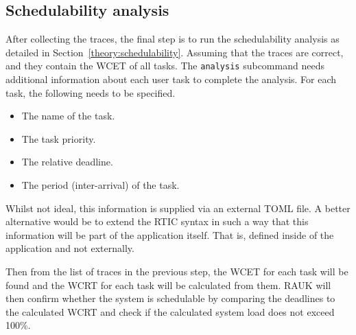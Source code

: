 \subsection{Schedulability analysis}
After collecting the traces, the final step is to run the schedulability analysis as
detailed in Section~\ref{theory:schedulability}. Assuming that the traces are correct,
and they contain the WCET of all tasks. The \texttt{analysis} subcommand needs
additional information about each user task to complete the analysis. For each
task, the following needs to be specified.
\begin{itemize}
    \item The name of the task.
    \item The task priority.
    \item The relative deadline.
    \item The period (inter-arrival) of the task.
\end{itemize}
Whilst not ideal, this information is supplied via an external TOML file. A
better alternative would be to extend the RTIC syntax in such a way that this
information will be part of the application itself. That is, defined inside of
the application and not externally.

Then from the list of traces in the previous step, the WCET for each task will
be found and the WCRT for each task will be calculated from them. RAUK will
then confirm whether the system is schedulable by comparing the deadlines to
the calculated WCRT and check if the calculated system load does not exceed
100\%.
